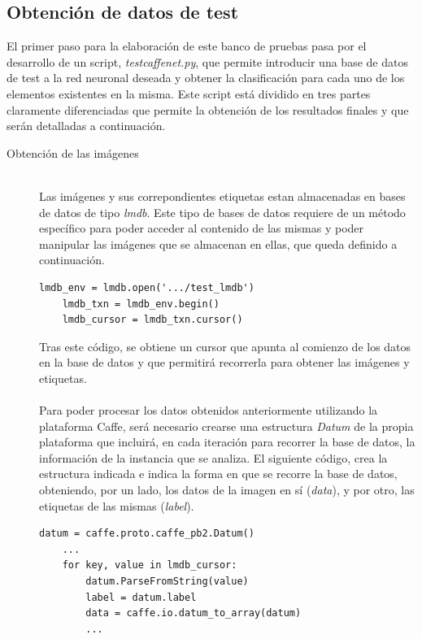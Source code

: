\subsection{Obtención de datos de test}
El primer paso para la elaboración de este banco de pruebas pasa por el desarrollo de un script, \textit{testcaffenet.py}, que permite introducir una base de datos de test a la red neuronal deseada y obtener la clasificación para cada uno de los elementos existentes en la misma. Este script está dividido en tres partes claramente diferenciadas que permite la obtención de los resultados finales y que serán detalladas a continuación.

\begin{description}
	\item[Obtención de las imágenes] \hfill 
	\vspace{5pt}
	\\
	Las imágenes y sus correpondientes etiquetas estan almacenadas en bases de datos de tipo \textit{lmdb}. Este tipo de bases de datos requiere de un método específico para poder acceder al contenido de las mismas y poder manipular las imágenes que se almacenan en ellas, que queda definido a continuación.
	\vspace{10pt}
	\begin{lstlisting}[frame=single]
	lmdb_env = lmdb.open('.../test_lmdb')
	lmdb_txn = lmdb_env.begin()
	lmdb_cursor = lmdb_txn.cursor()
	\end{lstlisting}
	
	Tras este código, se obtiene un cursor que apunta al comienzo de los datos en la base de datos y que permitirá recorrerla para obtener las imágenes y etiquetas.\\
	\vspace{-10pt}
	\\
	Para poder procesar los datos obtenidos anteriormente utilizando la plataforma Caffe, será necesario crearse una estructura \textit{Datum} de la propia plataforma que incluirá, en cada iteración para recorrer la base de datos, la información de la instancia que se analiza. El siguiente código, crea la estructura indicada e indica la forma en que se recorre la base de datos, obteniendo, por un lado, los datos de la imagen en sí (\textit{data}), y por otro, las etiquetas de las mismas (\textit{label}).
	\vspace{10pt}
	\begin{lstlisting}[frame=single]
	datum = caffe.proto.caffe_pb2.Datum()
	...
	for key, value in lmdb_cursor:
		datum.ParseFromString(value)
		label = datum.label
		data = caffe.io.datum_to_array(datum)
		...
	\end{lstlisting}
	

\end{description}
